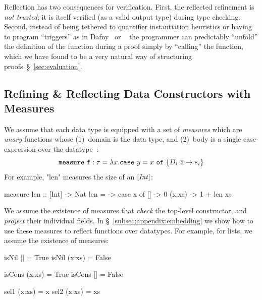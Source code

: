 %
Reflection has two consequences for verification.
%
First, the reflected refinement is \emph{not trusted};
it is itself verified (as a valid output type)
during type checking.
%
Second, instead of being tethered to quantifier
instantiation heuristics or having to program
``triggers'' as in Dafny~\citep{dafny} or
\fstar~\citep{fstar}
%
the programmer can predictably ``unfold'' the
definition of the function during a proof simply
by ``calling'' the function, which we have found
to be a very natural way of structuring
proofs~\S~\ref{sec:evaluation}.


\subsection{Refining \& Reflecting Data Constructors with Measures}
\label{subsec:appendix:measures}
\label{subsec:list}


We assume that each data type is equipped with
a set of \emph{measures} which are \emph{unary}
functions whose (1)~domain is the data type, and
(2)~body is a single case-expression over the
datatype~\cite{Vazou14}:
%
$$\mathtt{measure}\ \mathtt{f}:\mathtt{\tau} = \lambda x.  \mathtt{case}\ y=x\ \mathtt{of}\ \{ D_i\ \overline{z} \rightarrow e_i\} $$
%
For example, "len" measures the size of an $[\mathit{Int}]$:
%
\begin{code}
  measure len :: [Int] -> Nat
  len = \x -> case x of
                []     -> 0
                (x:xs) -> 1 + len xs
\end{code}

%
We assume the existence of measures that
\emph{check} the top-level constructor,
and \emph{project} their individual fields.
%
In \S~\ref{subsec:appendix:embedding} we show how to
use these measures to reflect functions over
datatypes.
%
%
For example, for lists, we assume the existence of measures:
%
\begin{code}
  isNil []      = True
  isNil (x:xs)  = False

  isCons (x:xs) = True
  isCons []     = False

  sel1 (x:xs)   = x
  sel2 (x:xs)   = xs
\end{code}

